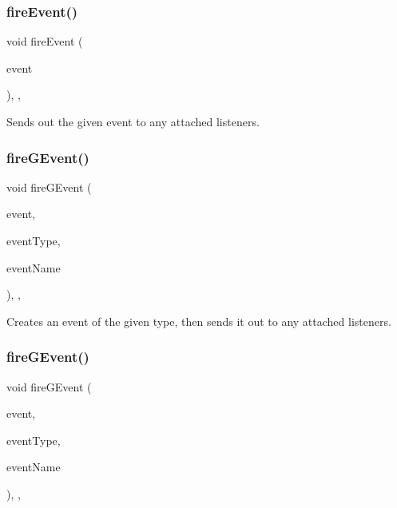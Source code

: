 \subsubsection{\texorpdfstring{fire\+Event()}{fireEvent()}}
{\footnotesize\ttfamily void fire\+Event (\begin{DoxyParamCaption}\item[{\mbox{\hyperlink{classGEvent}{G\+Event}} \&}]{event }\end{DoxyParamCaption})\hspace{0.3cm}{\ttfamily [protected]}, {\ttfamily [virtual]}, {\ttfamily [inherited]}}



Sends out the given event to any attached listeners. 

\mbox{\label{classGObservable_ab3983ea07337b52020a29cc00c653d8d}} 
\subsubsection{\texorpdfstring{fire\+G\+Event()}{fireGEvent()}\hspace{0.1cm}{\footnotesize\ttfamily [1/8]}}
{\footnotesize\ttfamily void fire\+G\+Event (\begin{DoxyParamCaption}\item[{Q\+Event $\ast$}]{event,  }\item[{Event\+Type}]{event\+Type,  }\item[{const std\+::string \&}]{event\+Name }\end{DoxyParamCaption})\hspace{0.3cm}{\ttfamily [protected]}, {\ttfamily [virtual]}, {\ttfamily [inherited]}}



Creates an event of the given type, then sends it out to any attached listeners. 

\mbox{\label{classGObservable_a01fdf1b0e0dbd49e189fe4514e010411}} 
\subsubsection{\texorpdfstring{fire\+G\+Event()}{fireGEvent()}\hspace{0.1cm}{\footnotesize\ttfamily [2/8]}}
{\footnotesize\ttfamily void fire\+G\+Event (\begin{DoxyParamCaption}\item[{Q\+Close\+Event $\ast$}]{event,  }\item[{Event\+Type}]{event\+Type,  }\item[{const std\+::string \&}]{event\+Name }\end{DoxyParamCaption})\hspace{0.3cm}{\ttfamily [protected]}, {\ttfamily [virtual]}, {\ttfamily [inherited]}}




